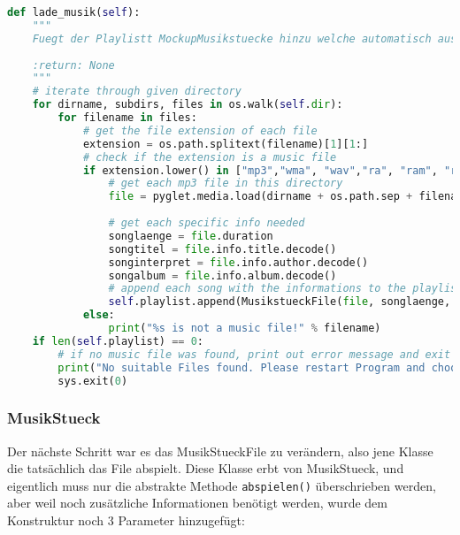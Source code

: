 \begin{lstlisting}[language=Python]
def lade_musik(self):
    """
    Fuegt der Playlistt MockupMusikstuecke hinzu welche automatisch ausgelesen werden
    
    :return: None
    """ 
    # iterate through given directory
    for dirname, subdirs, files in os.walk(self.dir):
	    for filename in files:
		    # get the file extension of each file
		    extension = os.path.splitext(filename)[1][1:]
		    # check if the extension is a music file
		    if extension.lower() in ["mp3","wma", "wav","ra", "ram", "rm", "mid", "flac", "ogg"]:
				# get each mp3 file in this directory
			    file = pyglet.media.load(dirname + os.path.sep + filename)
    
			    # get each specific info needed
			    songlaenge = file.duration
			    songtitel = file.info.title.decode()
			    songinterpret = file.info.author.decode()
			    songalbum = file.info.album.decode()
			    # append each song with the informations to the playlist and the gui object
			    self.playlist.append(MusikstueckFile(file, songlaenge, songtitel, songinterpret, songalbum, self.updatefunction))
		    else:
			    print("%s is not a music file!" % filename)
    if len(self.playlist) == 0:
	    # if no music file was found, print out error message and exit program
	    print("No suitable Files found. Please restart Program and choose another Folder")
	    sys.exit(0)
\end{lstlisting}

\clearpage

\subsubsection{MusikStueck}
Der nächste Schritt war es das MusikStueckFile zu verändern, also jene Klasse die tatsächlich das File abspielt. Diese Klasse erbt von MusikStueck, und eigentlich muss nur die abstrakte Methode \verb|abspielen()| überschrieben werden, aber weil noch zusätzliche Informationen benötigt werden, wurde dem Konstruktur noch 3 Parameter hinzugefügt:

